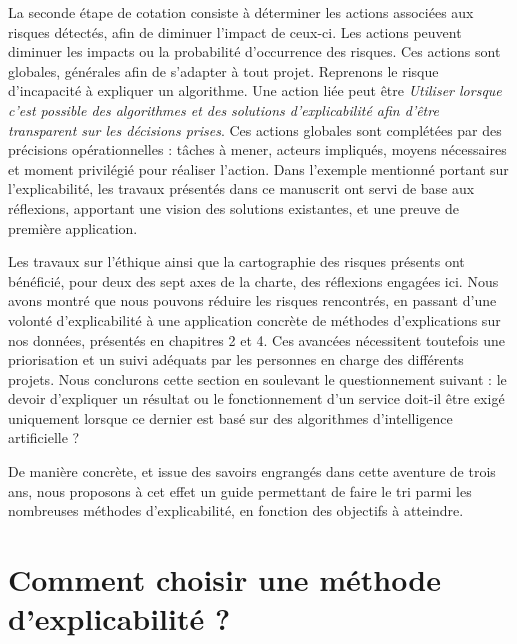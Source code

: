 La seconde étape de cotation consiste à déterminer les actions associées aux risques détectés, afin de diminuer l'impact de ceux-ci. Les actions peuvent diminuer les impacts ou la probabilité d'occurrence des risques. Ces actions sont globales, générales afin de s'adapter à tout projet. Reprenons le risque d'incapacité à expliquer un algorithme. Une action liée peut être \textit{Utiliser lorsque c'est possible des algorithmes et des solutions d'explicabilité afin d'être transparent sur les décisions prises}. Ces actions globales sont complétées par des précisions opérationnelles : tâches à mener, acteurs impliqués, moyens nécessaires et moment privilégié pour réaliser l'action. Dans l'exemple mentionné portant sur l'explicabilité, les travaux présentés dans ce manuscrit ont servi de base aux réflexions, apportant une vision des solutions existantes, et une preuve de première application.


Les travaux sur l'éthique ainsi que la cartographie des risques présents ont bénéficié, pour deux des sept axes de la charte, des réflexions engagées ici. Nous avons montré que nous pouvons réduire les risques rencontrés, en passant d'une volonté d'explicabilité à une application concrète de méthodes d'explications sur nos données, présentés en chapitres 2 et 4. Ces avancées nécessitent toutefois une priorisation et un suivi adéquats par les personnes en charge des différents projets. Nous conclurons cette section en soulevant le questionnement suivant : le devoir d'expliquer un résultat ou le fonctionnement d'un service doit-il être exigé uniquement lorsque ce dernier est basé sur des algorithmes d'intelligence artificielle ?

De manière concrète, et issue des savoirs engrangés dans cette aventure de trois ans, nous proposons à cet effet un guide permettant de faire le tri parmi les nombreuses méthodes d'explicabilité, en fonction des objectifs à atteindre.

\section{Comment choisir une méthode d'explicabilité ?} \label{C6:guide}

